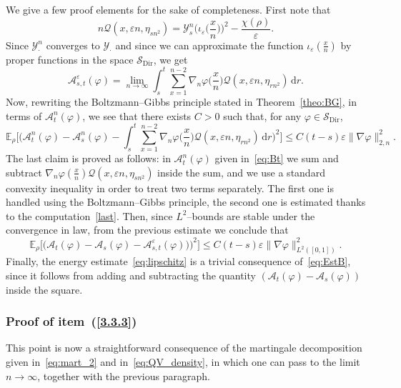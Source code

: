 \documentclass[10pt]{amsart}
\theoremstyle{definition}\newtheorem{defi}[theo]{Definition}\newtheorem{rema}[theo]{Remark}\newtheorem{exam}[theo]{Example}\newtheorem{exem}[theo]{Example}\newtheorem{nota}[theo]{Notation}
\DeclareMathOperator{\Dir}{Dir}
\newcommand{\bb}[1]{{\mathbb #1}}
\newcommand{\mc}[1]{{\mathcal #1}}
\renewcommand{\mc}[1]{{\mathcal #1}}
\renewcommand{\leq}{\leqslant}
\newcommand*{\dd}{\mathrm{d}}
\newcommand*{\dr}{\dd r}
\renewcommand{\tfrac}{\frac}
\begin{document}
We give a few proof elements for the sake of completeness. First note that
\[
n\mc Q(x,\varepsilon n,\eta_{sn^2})=\mc Y^n_s\Big(\iota_{\varepsilon}\Big(\tfrac xn\Big)\Big)^2-\tfrac {\chi(\rho)}{\varepsilon}.
\]
Since $\mc Y^n_\cdot$ converges to $\mc Y_\cdot$ and since we can approximate the function $\iota_{\varepsilon}(\tfrac xn)$ by proper functions in the space $\mc S_{\mathrm{Dir}}$, we get
\[
\mc A^\varepsilon_{s,t}(\varphi)=\lim_{n\to\infty}\int_s^t\sum_{x=1}^{n-2}\nabla_n\varphi\Big(\tfrac xn\Big)\mc Q(x,\varepsilon n,\eta_{rn^2})\,\dr.
\]
Now, rewriting the Boltzmann--Gibbs principle stated in Theorem~\ref{theo:BG}, in terms of $\mc A_t^n(\varphi)$, we see that there exists $C>0$ such that, for any {$\varphi \in \mc S_{\Dir}$},
\begin{equation*}
\bb E_\rho\Big[\Big({\mc A^n_t(\varphi)-\mc A^n_s(\varphi)}-\int_s^t\sum_{x=1}^{n-2}\nabla_n\varphi\Big(\tfrac xn\Big)\mc Q(x,\varepsilon n,\eta_{rn^2})\,\dr\Big)^2\Big] \leq C(t-s)\varepsilon \big\|\nabla\varphi\big\|_{2,n}^2.
\end{equation*}
The last claim is proved as follows: in {$\mc A_t^n(\varphi)$} given in~\eqref{eq:Bt} we sum and subtract $\nabla_n\varphi(\frac x n)\mc Q(x,\varepsilon n,\eta_{sn^2})$ inside the sum, and we use a standard convexity inequality in order to treat two terms separately. The first one is handled using the Boltzmann--Gibbs principle, the second one is estimated thanks to the computation~\eqref{last}. Then, since $L^2$--bounds are stable under the convergence in law, from the previous estimate we conclude that
\begin{equation}\label{eq:EstB}
\bb E_\rho\Big[\Big({\mc A_t(\varphi)-\mc A_s(\varphi)}-\mc A^\varepsilon_{s,t}(\varphi))\Big)^2\Big] \leq C(t-s)\varepsilon \big\|\nabla\varphi\big\|_{L^2([0,1])}^2.
\end{equation}
Finally, the energy estimate~\eqref{eq:lipschitz} is a trivial consequence of~\eqref{eq:EstB}, since it follows from adding and subtracting the quantity {$(\mc A_t(\varphi)-\mc A_s(\varphi))$} inside the square.

\subsubsection{Proof of item~(\ref{3.3.3})}

This point is now a straightforward consequence of the martingale decomposition given in~\eqref{eq:mart_2} and in~\eqref{eq:QV_density}, in which one can pass to the limit $n\to\infty$, together with the previous paragraph.
\end{document}
